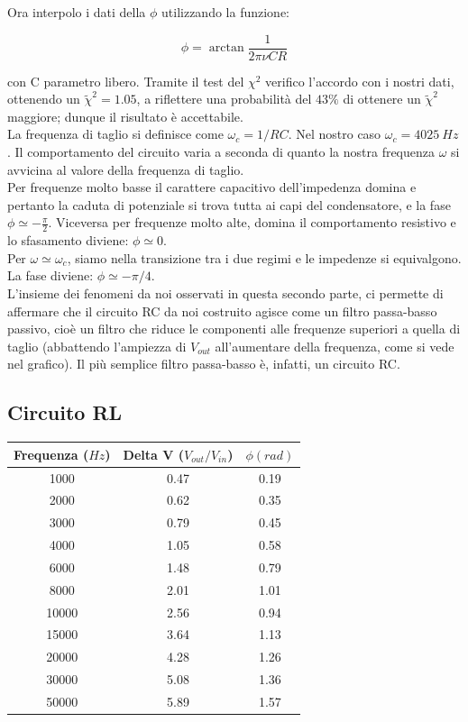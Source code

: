 Ora interpolo i dati della $ \phi$ utilizzando la funzione:

$$ \phi = \arctan \frac{1}{2\pi\nu C R} $$

con C parametro libero. Tramite il test del $\chi^2$ verifico l'accordo con i nostri dati, ottenendo un $\tilde{\chi}^2 = 1.05$, a riflettere una probabilità del $43\%$ di ottenere un $\tilde{\chi}^2$ maggiore; dunque il risultato è accettabile.
\\


La frequenza di taglio si definisce come $\omega_c = 1/RC$. Nel nostro caso $\omega_c = 4025\ Hz$. Il comportamento del circuito varia a seconda di quanto la nostra frequenza $\omega$ si avvicina al valore della frequenza di taglio. \\
Per frequenze molto basse il carattere capacitivo dell'impedenza domina e pertanto la caduta di potenziale si trova tutta ai capi del condensatore, e la fase $\phi \simeq -\frac{\pi}{2}$. Viceversa per frequenze molto alte, domina il comportamento resistivo e lo sfasamento diviene: $ \phi \simeq 0$. \\  
Per $\omega \simeq \omega_c$, siamo nella transizione tra i due regimi e le impedenze si equivalgono. La fase diviene: $ \phi \simeq -\pi/4$.  \\

L'insieme dei fenomeni da noi osservati in questa secondo parte, ci permette di affermare che il circuito RC da noi costruito agisce come un filtro passa-basso passivo, cioè un filtro che riduce le componenti alle frequenze superiori a quella di taglio (abbattendo l'ampiezza di $V_{out}$ all'aumentare della frequenza, come si vede nel grafico). Il più semplice filtro passa-basso è, infatti, un circuito RC. 

\subsection{Circuito RL}
\begin{center}

\begin{tabular}{*{3}{c}}
Frequenza ($Hz$) & Delta V ($V_{out}/V_{in}$) & $\phi (rad)$ \\
\midrule
1000& 0.47 & 0.19 \\
2000 & 0.62 & 0.35\\
3000 & 0.79 & 0.45\\
4000 & 1.05 & 0.58\\
6000 & 1.48 & 0.79\\
8000 & 2.01 & 1.01\\
10000 & 2.56 & 0.94\\
15000 & 3.64 & 1.13\\
20000 & 4.28 & 1.26\\
30000 & 5.08 & 1.36\\
50000 & 5.89 & 1.57\\
\end{tabular}
\end{center}


